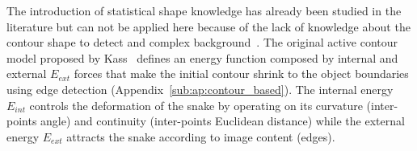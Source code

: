 



The introduction of statistical shape knowledge has already been studied in the literature but can not be applied here because of the lack of knowledge about the contour shape to detect and complex background~\cite{Cremers2002}.
The original active contour model proposed by Kass~\cite{Kass1988} defines an energy function composed by internal and external $E_{ext}$ forces that make the initial contour shrink to the object boundaries using edge detection (Appendix~\ref{sub:ap:contour_based}).
The internal energy $E_{int}$ controls the deformation of the snake by operating on its curvature (inter-points angle) and continuity (inter-points Euclidean distance) while the external energy $E_{ext}$ attracts the snake according to image content (edges).

